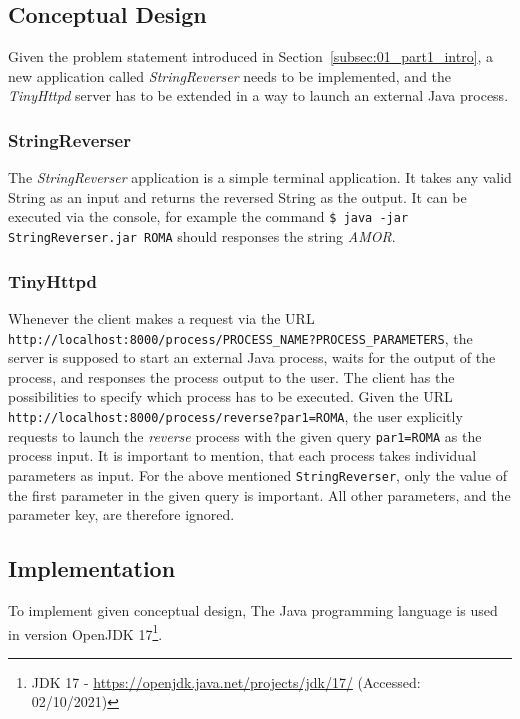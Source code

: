 \documentclass{article}
\def\Sec#1{Section~\ref{#1}}
\begin{document}
\subsection{Conceptual Design}\label{subsec:01_part1_design}
Given the problem statement introduced in \Sec{subsec:01_part1_intro}, a new application called \textit{StringReverser} needs to be implemented, and the \textit{TinyHttpd} server has to be extended in a way to launch an external Java process.

\subsubsection{StringReverser}
The \textit{StringReverser} application is a simple terminal application. It takes any valid String as an input and returns the reversed String as the output. It can be executed via the console, for example the command \texttt{\$ java -jar StringReverser.jar ROMA} should responses the string \textit{AMOR}.

\subsubsection{TinyHttpd}
Whenever the client makes a request via the URL \texttt{http://localhost:8000/process/PROCESS\_NAME?PROCESS\_PARAMETERS}, the server is supposed to start an external Java process, waits for the output of the process, and responses the process output to the user.
The client has the possibilities to specify which process has to be executed. Given the URL \texttt{http://localhost:8000/process/reverse?par1=ROMA}, the user explicitly requests to launch the \textit{reverse} process with the given query \texttt{par1=ROMA} as the process input.
It is important to mention, that each process takes individual parameters as input. For the above mentioned \texttt{StringReverser}, only the value of the first parameter in the given query is important. All other parameters, and the parameter key, are therefore ignored.

\subsection{Implementation}\label{subsec:01_part1_impl}
To implement given conceptual design, The Java programming language is used in version OpenJDK 17\footnote{JDK 17 - \url{https://openjdk.java.net/projects/jdk/17/} (Accessed: 02/10/2021)}.
\end{document}
